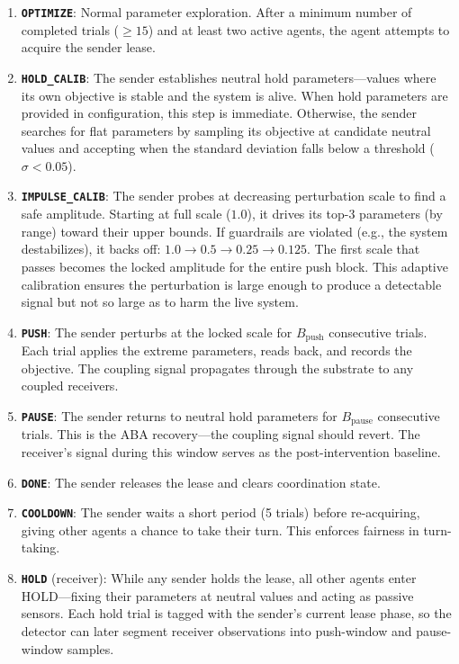 \begin{enumerate}
  \item \textbf{\texttt{OPTIMIZE}}: Normal parameter exploration. After
    a minimum number of completed trials ($\geq 15$) and at least two
    active agents, the agent attempts to acquire the sender lease.

  \item \textbf{\texttt{HOLD\_CALIB}}: The sender establishes neutral
    hold parameters---values where its own objective is stable and the
    system is alive. When hold parameters are provided in
    configuration, this step is immediate. Otherwise, the sender
    searches for flat parameters by sampling its objective at
    candidate neutral values and accepting when the standard deviation
    falls below a threshold ($\sigma < 0.05$).

  \item \textbf{\texttt{IMPULSE\_CALIB}}: The sender probes at
    decreasing perturbation scale to find a safe amplitude. Starting
    at full scale ($1.0$), it drives its top-3 parameters (by range)
    toward their upper bounds. If guardrails are violated (e.g., the
    system destabilizes), it backs off: $1.0 \to 0.5 \to 0.25 \to
    0.125$. The first scale that passes becomes the locked amplitude
    for the entire push block. This adaptive calibration ensures the
    perturbation is large enough to produce a detectable signal but
    not so large as to harm the live system.

  \item \textbf{\texttt{PUSH}}: The sender perturbs at the locked
    scale for $B_{\text{push}}$ consecutive trials. Each trial applies
    the extreme parameters, reads back, and records the objective.
    The coupling signal propagates through the substrate to any
    coupled receivers.

  \item \textbf{\texttt{PAUSE}}: The sender returns to neutral hold
    parameters for $B_{\text{pause}}$ consecutive trials. This is the
    ABA recovery---the coupling signal should revert. The receiver's
    signal during this window serves as the post-intervention
    baseline.

  \item \textbf{\texttt{DONE}}: The sender releases the lease and
    clears coordination state.

  \item \textbf{\texttt{COOLDOWN}}: The sender waits a short period
    (5 trials) before re-acquiring, giving other agents a chance to
    take their turn. This enforces fairness in turn-taking.

  \item \textbf{\texttt{HOLD}} (receiver): While any sender holds the
    lease, all other agents enter HOLD---fixing their parameters at
    neutral values and acting as passive sensors. Each hold trial is
    tagged with the sender's current lease phase, so the detector
    can later segment receiver observations into push-window and
    pause-window samples.
\end{enumerate}

